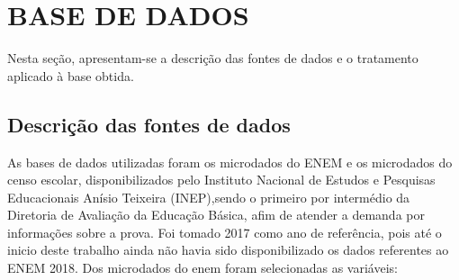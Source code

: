 \chapter[BASE DE DADOS]{BASE DE DADOS} %

Nesta seção, apresentam-se a descrição das fontes de dados e o tratamento aplicado à base obtida.

\section{Descrição das fontes de dados}

As bases de dados utilizadas foram os microdados do ENEM e os microdados do censo escolar, disponibilizados pelo Instituto Nacional de Estudos e Pesquisas Educacionais Anísio Teixeira (INEP),sendo o primeiro por intermédio da Diretoria de Avaliação da Educação Básica, afim de atender a demanda por informações sobre a prova. Foi tomado 2017 como ano de referência, pois até o inicio deste trabalho ainda não havia sido disponibilizado os dados referentes ao ENEM 2018.
Dos microdados do enem foram selecionadas as variáveis:
